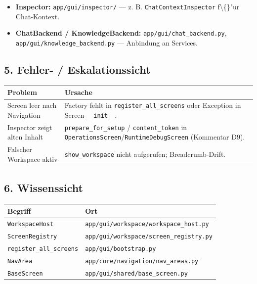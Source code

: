 \begin{itemize}
\item \textbf{Inspector:} \texttt{app/gui/inspector/} --- z. B. \texttt{ChatContextInspector} f\textbackslash\{\}"ur Chat-Kontext.
\item \textbf{ChatBackend / KnowledgeBackend:} \texttt{app/gui/chat\_backend.py}, \texttt{app/gui/knowledge\_backend.py} --- Anbindung an Services.
\end{itemize}

\subsection{5. Fehler- / Eskalationssicht}

\begin{center}
\begin{tabular}{ll}
\hline
Problem & Ursache \\
\hline
Screen leer nach Navigation & Factory fehlt in \texttt{register\_all\_screens} oder Exception in Screen-\texttt{\_\_init\_\_}. \\
Inspector zeigt alten Inhalt & \texttt{prepare\_for\_setup} / \texttt{content\_token} in \texttt{OperationsScreen}/\texttt{RuntimeDebugScreen} (Kommentar D9). \\
Falscher Workspace aktiv & \texttt{show\_workspace} nicht aufgerufen; Breadcrumb-Drift. \\
\hline
\end{tabular}
\end{center}

\subsection{6. Wissenssicht}

\begin{center}
\begin{tabular}{ll}
\hline
Begriff & Ort \\
\hline
\texttt{WorkspaceHost} & \texttt{app/gui/workspace/workspace\_host.py} \\
\texttt{ScreenRegistry} & \texttt{app/gui/workspace/screen\_registry.py} \\
\texttt{register\_all\_screens} & \texttt{app/gui/bootstrap.py} \\
\texttt{NavArea} & \texttt{app/core/navigation/nav\_areas.py} \\
\texttt{BaseScreen} & \texttt{app/gui/shared/base\_screen.py} \\
\hline
\end{tabular}
\end{center}

